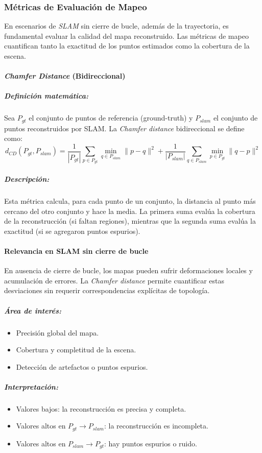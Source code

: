 \documentclass[12pt, a4paper, twoside]{article}
\begin{document}
\subsubsection{Métricas de Evaluación de Mapeo}

En escenarios de \textit{SLAM\cite{smith1987slam}} sin cierre de bucle, además de la trayectoria, 
es fundamental evaluar la calidad del mapa reconstruido. 
Las métricas de mapeo cuantifican tanto la exactitud de los puntos estimados 
como la cobertura de la escena.

\paragraph{\textit{Chamfer\cite{Fan2020Chamfer} Distance} (Bidireccional)}

\subparagraph{Definición matemática:}
Sea $P_{gt}$ el conjunto de puntos de referencia (ground-truth) 
y $P_{slam}$ el conjunto de puntos reconstruidos por SLAM\cite{smith1987slam}. 
La \textit{Chamfer\cite{Fan2020Chamfer} distance} bidireccional se define como:
\[
d_{CD}(P_{gt}, P_{slam}) = \frac{1}{|P_{gt}|} \sum_{p \in P_{gt}} 
\min_{q \in P_{slam}} \|p - q\|^2
+
\frac{1}{|P_{slam}|} \sum_{q \in P_{slam}} 
\min_{p \in P_{gt}} \|q - p\|^2
\]
\subparagraph{Descripción:}
Esta métrica calcula, para cada punto de un conjunto, la distancia al punto más cercano del otro conjunto y 
hace la media. La primera suma evalúa la cobertura de la reconstrucción (si faltan regiones), mientras que la 
segunda suma evalúa la exactitud (si se agregaron puntos espurios).

\paragraph{Relevancia en SLAM\cite{smith1987slam} sin cierre de bucle}
En ausencia de cierre de bucle, los mapas pueden sufrir deformaciones locales y acumulación de errores. 
La \textit{Chamfer\cite{Fan2020Chamfer} distance} permite cuantificar estas desviaciones sin requerir correspondencias explícitas de topología.

\subparagraph{Área de interés:}
\begin{itemize}
  \item Precisión global del mapa.
  \item Cobertura y completitud de la escena.
  \item Detección de artefactos o puntos espurios.
\end{itemize}

\subparagraph{Interpretación:}
\begin{itemize}
  \item Valores bajos: la reconstrucción es precisa y completa.  
  \item Valores altos en $P_{gt} \to P_{slam}$: la reconstrucción es incompleta.
  \item Valores altos en $P_{slam} \to P_{gt}$: hay puntos espurios o ruido.
\end{itemize}
\end{document}
